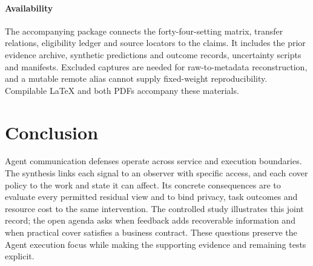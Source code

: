 \paragraph{Availability}
The accompanying package connects the forty-four-setting matrix, transfer relations, eligibility ledger and source locators to the claims. It includes the prior evidence archive, synthetic predictions and outcome records, uncertainty scripts and manifests. Excluded captures are needed for raw-to-metadata reconstruction, and a mutable remote alias cannot supply fixed-weight reproducibility. Compilable LaTeX and both PDFs accompany these materials.

\section{Conclusion}
Agent communication defenses operate across service and execution boundaries. The synthesis links each signal to an observer with specific access, and each cover policy to the work and state it can affect. Its concrete consequences are to evaluate every permitted residual view and to bind privacy, task outcomes and resource cost to the same intervention. The controlled study illustrates this joint record; the open agenda asks when feedback adds recoverable information and when practical cover satisfies a business contract. These questions preserve the Agent execution focus while making the supporting evidence and remaining tests explicit.
